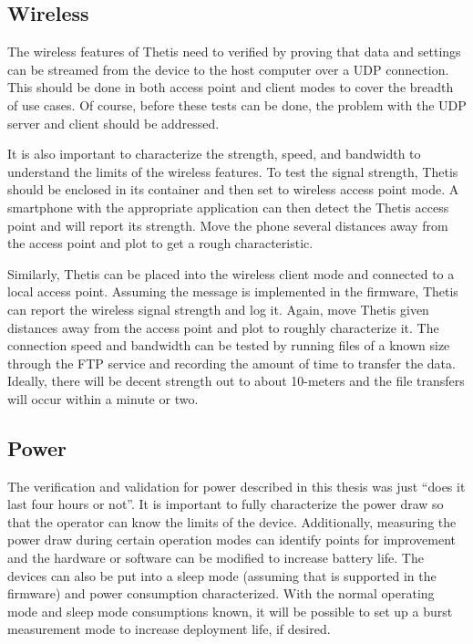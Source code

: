 \subsection{Wireless} 
The wireless features of Thetis need to verified by proving that data and settings can be streamed from the device to the host computer over a UDP connection.
This should be done in both access point and client modes to cover the breadth of use cases.
Of course, before these tests can be done, the problem with the UDP server and client should be addressed.

It is also important to characterize the strength, speed, and bandwidth to understand the limits of the wireless features.
To test the signal strength, Thetis should be enclosed in its container and then set to wireless access point mode.
A smartphone with the appropriate application can then detect the Thetis access point and will report its strength.
Move the phone several distances away from the access point and plot to get a rough characteristic.

Similarly, Thetis can be placed into the wireless client mode and connected to a local access point.
Assuming the message is implemented in the firmware, Thetis can report the wireless signal strength and log it.
Again, move Thetis given distances away from the access point and plot to roughly characterize it.
The connection speed and bandwidth can be tested by running files of a known size through the FTP service and recording the amount of time to transfer the data.
Ideally, there will be decent strength out to about 10-meters and the file transfers will occur within a minute or two.

\subsection{Power} 
The verification and validation for power described in this thesis was just ``does it last four hours or not''.
It is important to fully characterize the power draw so that the operator can know the limits of the device.
Additionally, measuring the power draw during certain operation modes can identify points for improvement and the hardware or software can be modified to increase battery life.
The devices can also be put into a sleep mode (assuming that is supported in the firmware) and power consumption characterized.
With the normal operating mode and sleep mode consumptions known, it will be possible to set up a burst measurement mode to increase deployment life, if desired.

